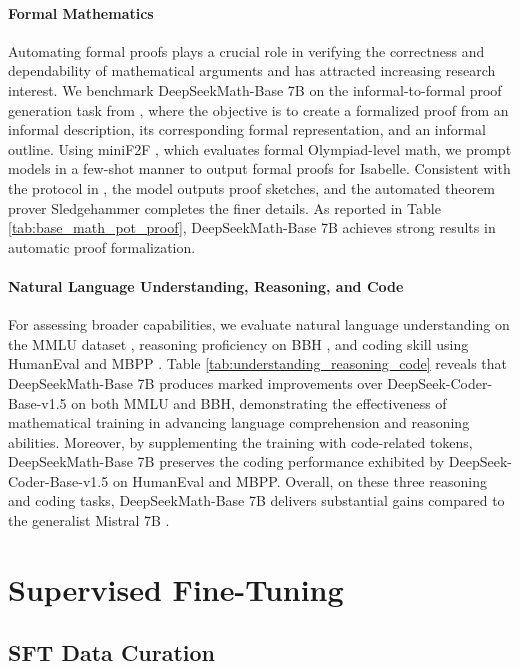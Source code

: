 \paragraph{Formal Mathematics}

Automating formal proofs plays a crucial role in verifying the correctness and dependability of mathematical arguments and has attracted increasing research interest. We benchmark DeepSeekMath-Base 7B on the informal-to-formal proof generation task from \citep{dsp_proof}, where the objective is to create a formalized proof from an informal description, its corresponding formal representation, and an informal outline. Using miniF2F \citep{minif2f}, which evaluates formal Olympiad-level math, we prompt models in a few-shot manner to output formal proofs for Isabelle. Consistent with the protocol in \cite{dsp_proof}, the model outputs proof sketches, and the automated theorem prover Sledgehammer \citep{sledgehammer} completes the finer details. As reported in Table \ref{tab:base_math_pot_proof}, DeepSeekMath-Base 7B achieves strong results in automatic proof formalization.

\paragraph{Natural Language Understanding, Reasoning, and Code}

For assessing broader capabilities, we evaluate natural language understanding on the MMLU dataset \citep{mmlu}, reasoning proficiency on BBH \citep{bbh}, and coding skill using HumanEval \citep{codex} and MBPP \citep{mbpp}. Table \ref{tab:understanding_reasoning_code} reveals that DeepSeekMath-Base 7B produces marked improvements over DeepSeek-Coder-Base-v1.5 \citep{deepseek-coder} on both MMLU and BBH, demonstrating the effectiveness of mathematical training in advancing language comprehension and reasoning abilities. Moreover, by supplementing the training with code-related tokens, DeepSeekMath-Base 7B preserves the coding performance exhibited by DeepSeek-Coder-Base-v1.5 on HumanEval and MBPP. Overall, on these three reasoning and coding tasks, DeepSeekMath-Base 7B delivers substantial gains compared to the generalist Mistral 7B \citep{mistral}.

\section{Supervised Fine-Tuning}

\subsection{SFT Data Curation}

